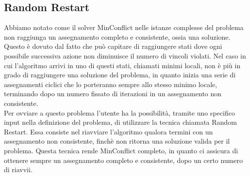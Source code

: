 \subsection{Random Restart}
\label{RR}
Abbiamo notato come il solver MinConflict nelle istanze complesse del problema non raggiunga un assegnamento completo e consistente, ossia una soluzione. Questo è dovuto dal fatto che può capitare di raggiungere stati dove ogni possibile successiva azione non diminuisce il numero di vincoli violati. Nel caso in cui l'algoritmo arrivi in uno di questi stati, chiamati minimi locali, non è più in grado di raggiungere una soluzione del problema, in quanto inizia una serie di assegnamenti ciclici che lo porteranno sempre allo stesso minimo locale, terminando dopo un numero fissato di iterazioni in un assegnamento non consistente.\\
Per ovviare a questo problema l'utente ha la possibilità, tramite uno specifico input nella definizione del problema, di utilizzare la tecnica chiamata Random Restart. Essa consiste nel riavviare l'algoritmo qualora termini con un assegnamento non consistente, finchè non ritorna una soluzione valida per il problema. Questa tecnica rende MinConflict completo, in quanto ci assicura di ottenere sempre un assegnamento completo e consistente, dopo un certo numero di riavvii.\\



 
